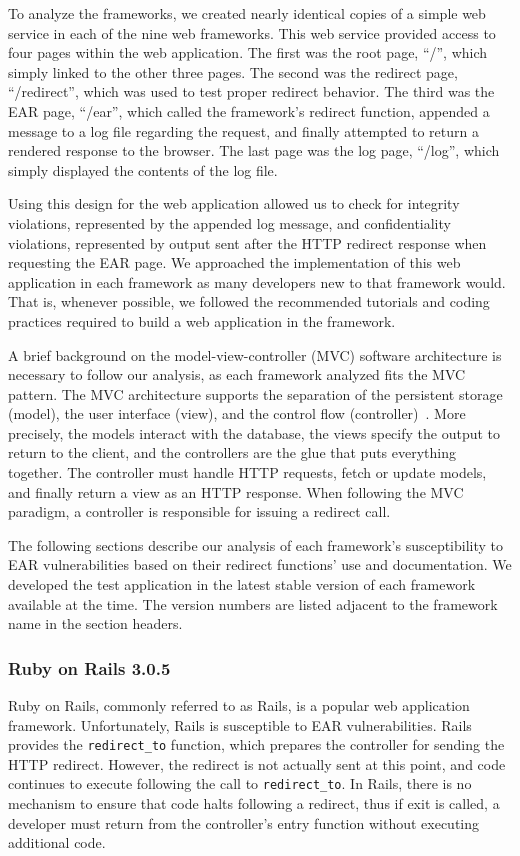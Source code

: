 To analyze the frameworks, we created nearly identical copies of a simple
web service in each of the nine web frameworks. This web service provided
access to four pages within the web application. The first was the root
page, ``/'', which simply linked to the other three pages. The second was
the redirect page, ``/redirect'', which was used to test proper redirect
behavior. The third was the EAR page, ``/ear'', which called the
framework's redirect function, appended a message to a log file regarding
the request, and finally attempted to return a rendered response to the
browser. The last page was the log page, ``/log'', which simply displayed
the contents of the log file.

Using this design for the web application allowed us to check for integrity
violations, represented by the appended log message, and confidentiality
violations, represented by output sent after the HTTP redirect response
when requesting the EAR page. We approached the implementation of this web
application in each framework as many developers new to that framework
would. That is, whenever possible, we followed the recommended tutorials
and coding practices required to build a web application in the framework.

A brief background on the model-view-cont\-rol\-ler (MVC) software
architecture is necessary to follow our analysis, as each framework
analyzed fits the MVC pattern. The MVC architecture supports the separation
of the persistent storage (model), the user interface (view), and the
control flow (controller)~\cite{reenskaug79:mvc}. More precisely, the
models interact with the database, the views specify the output to return
to the client, and the controllers are the glue that puts everything
together. The controller must handle HTTP requests, fetch or update models,
and finally return a view as an HTTP response. When following the MVC
paradigm, a controller is responsible for issuing a redirect call.

The following sections describe our analysis of each framework's
susceptibility to EAR vulnerabilities based on their redirect functions'
use and documentation. We developed the test application in the latest
stable version of each framework available at the time. The version numbers
are listed adjacent to the framework name in the section headers.

\subsubsection{Ruby on Rails 3.0.5}
Ruby on Rails, commonly referred to as Rails, is a popular web application
framework. Unfortunately, Rails is susceptible to EAR vulnerabilities.
Rails provides the \mbox{\texttt{redirect\_to}} function, which prepares
the controller for sending the HTTP redirect. However, the redirect is not
actually sent at this point, and code continues to execute following the
call to \mbox{\texttt{redirect\_to}}. In Rails, there is no mechanism to
ensure that code halts following a redirect, thus if exit is called, a
developer must return from the controller's entry function without
executing additional code.

